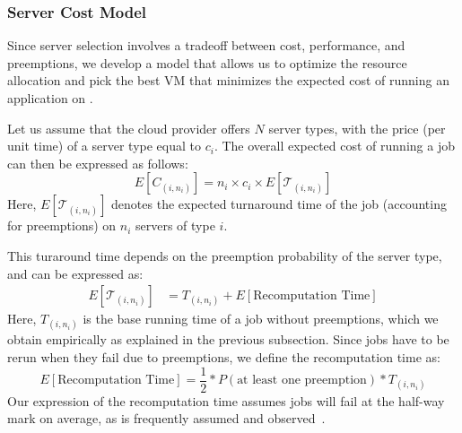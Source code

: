 \subsubsection{Server Cost Model}
\label{subsec:cost-model}

Since server selection involves a tradeoff between cost, performance, and preemptions, we develop a model that allows us to optimize the resource allocation and pick the best VM that minimizes the expected cost of running an application on \sysname. 




Let us assume that the cloud provider offers $N$ server types, with the price (per unit time) of a server type equal to $c_i$. 
The overall expected cost of running a job can then be expressed as follows:
\begin{equation}
  \label{eq:e-cost}
  E[C_{( i,n_i )}] = n_i\times c_i \times E[\mathcal{T}_{( i,n_i )}]
\end{equation}
Here, $E[\mathcal{T}_{( i,n_i )}]$ denotes the expected turnaround time of the job (accounting for preemptions) on $n_i$ servers of type $i$.

This turaround time depends on the preemption probability of the server type, and can be expressed as:
\begin{align}
  \label{eq:turnaround}
  E[\mathcal{T}_{( i,n_i )}] &= T_{( i,n_i )} + E[\text{Recomputation Time}]
\end{align}
Here, $T_{( i,n_i )}$ is the base running time of a job without preemptions, which we obtain empirically as explained in the previous subsection.
Since jobs have to be rerun when they fail due to preemptions, we define the recomputation time as:
\begin{equation}
  \label{eq:recomput}
   E[\text{Recomputation Time}] = \frac{1}{2}*P(\text{at least one preemption})* T_{( i,n_i )}   
 \end{equation}
Our expression of the recomputation time assumes jobs will fail at the half-way mark on average, as is frequently assumed and observed~\cite{young-daly, bougeret}. 

